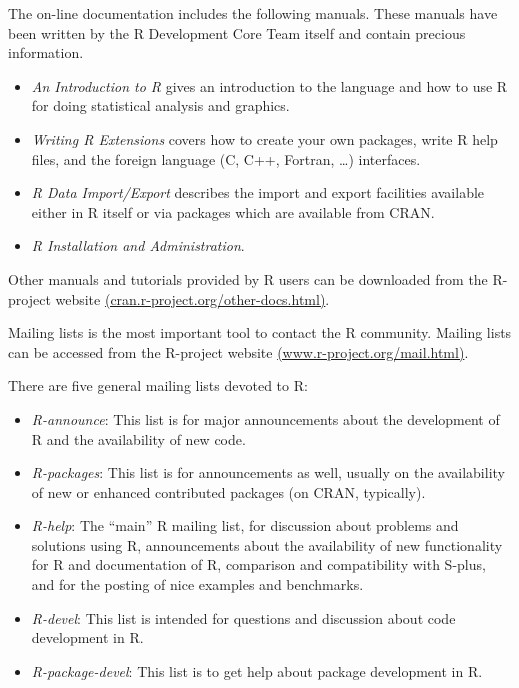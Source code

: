\documentclass[]{book}
\providecommand{\tightlist}{%
  \setlength{\itemsep}{0pt}\setlength{\parskip}{0pt}}
\def\tightlist{}
\begin{document}
The on-line documentation includes the following manuals. These manuals
have been written by the R Development Core Team itself and contain
precious information.

\begin{itemize}
\tightlist
\item
  \emph{An Introduction to R} gives an introduction to the language and
  how to use R for doing statistical analysis and graphics.
\item
  \emph{Writing R Extensions} covers how to create your own packages,
  write R help files, and the foreign language (C, C++, Fortran,
  \ldots{}) interfaces.
\item
  \emph{R Data Import/Export} describes the import and export facilities
  available either in R itself or via packages which are available from
  CRAN.
\item
  \emph{R Installation and Administration}.
\end{itemize}

Other manuals and tutorials provided by R users can be downloaded from
the R-project website
\href{http://cran.r-project.org/other-docs.html}{(cran.r-project.org/other-docs.html)}.

Mailing lists is the most important tool to contact the R community.
Mailing lists can be accessed from the R-project website
\href{http://www.r-project.org/mail.html}{(www.r-project.org/mail.html)}.

There are five general mailing lists devoted to R:

\begin{itemize}
\tightlist
\item
  \emph{R-announce}: This list is for major announcements about the
  development of R and the availability of new code.
\item
  \emph{R-packages}: This list is for announcements as well, usually on
  the availability of new or enhanced contributed packages (on CRAN,
  typically).
\item
  \emph{R-help}: The ``main'' R mailing list, for discussion about
  problems and solutions using R, announcements about the availability
  of new functionality for R and documentation of R, comparison and
  compatibility with S-plus, and for the posting of nice examples and
  benchmarks.
\item
  \emph{R-devel}: This list is intended for questions and discussion
  about code development in R.
\item
  \emph{R-package-devel}: This list is to get help about package
  development in R.
\end{itemize}
\end{document}
